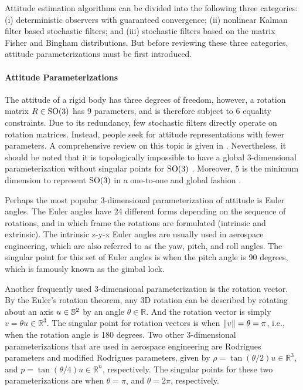 Attitude estimation algorithms can be divided into the following three categories:
(i) deterministic observers with guaranteed convergence;
(ii) nonlinear Kalman filter based stochastic filters;
and (iii) stochastic filters based on the matrix Fisher and Bingham distributions.
But before reviewing these three categories, attitude parameterizations must be first introduced.

\paragraph{Attitude Parameterizations}

The attitude of a rigid body has three degrees of freedom, however, a rotation matrix $R\in\mathrm{SO}(3)$ has 9 parameters, and is therefore subject to 6 equality constraints.
Due to its redundancy, few stochastic filters directly operate on rotation matrices.
Instead, people seek for attitude representations with fewer parameters.
A comprehensive review on this topic is given in \cite{shuster1993survey}.
Nevertheless, it should be noted that it is topologically impossible to have a global 3-dimensional parameterization without singular points for $\mathrm{SO}(3)$ \cite{stuelpnagel1964parametrization}.
Moreover, 5 is the minimum dimension to represent $\mathrm{SO}(3)$ in a one-to-one and global fashion \cite{stuelpnagel1964parametrization}.

Perhaps the most popular 3-dimensional parameterization of attitude is Euler angles.
The Euler angles have 24 different forms depending on the sequence of rotations, and in which frame the rotations are formulated (intrinsic and extrinsic).
The intrinsic z-y-x Euler angles are usually used in aerospace engineering, which are also referred to as the yaw, pitch, and roll angles.
The singular point for this set of Euler angles is when the pitch angle is 90 degrees, which is famously known as the gimbal lock.

Another frequently used 3-dimensional parameterization is the rotation vector.
By the Euler's rotation theorem, any 3D rotation can be described by rotating about an axis $u\in\mathbb{S}^2$ by an angle $\theta\in\mathbb{R}$.
And the rotation vector is simply $v = \theta u \in \mathbb{R}^3$.
The singular point for rotation vectors is when $\left\| v \right\| = \theta = \pi$, i.e., when the rotation angle is 180 degrees.
Two other 3-dimensional parameterizations that are used in aerospace engineering are Rodrigues parameters and modified Rodrigues parameters, given by $\rho = \tan(\theta/2) u \in \mathbb{R}^3$, and $p = \tan(\theta/4) u \in \mathbb{R}^n$, respectively.
The singular points for these two parameterizations are when $\theta = \pi$, and $\theta = 2\pi$, respectively.

